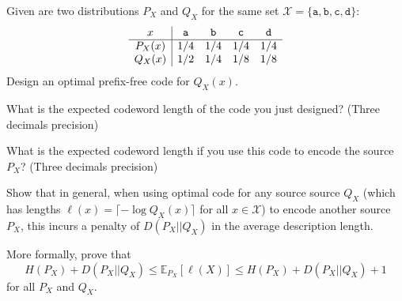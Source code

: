 \documentclass[a4paper,10pt,landscape,twocolumn]{scrartcl}
\begin{document}
\begin{exercise}
\begin{subex}[(2pt)]
Given are two distributions $P_X$ and $Q_X$ for the same set $\mathcal{X} = \{\mathtt{a,b,c,d}\}$:
\[
\begin{array}{c | c c c c}
x & \mathtt{a}&\mathtt{b}&\mathtt{c}&\mathtt{d}\\\hline
P_X(x) & 1/4&1/4&1/4&1/4\\
Q_X(x) & 1/2&1/4&1/8&1/8\\
\end{array}
\]
Design an optimal prefix-free code for $Q_X(x)$.
\end{subex}
\begin{subex}[(4pt)]
What is the expected codeword length of the code you just designed? (Three decimals precision)
\end{subex}
\begin{subex}[(4pt)]
What is the expected codeword length if you use this code to encode the source $P_X$? (Three decimals precision)
\end{subex}
\begin{subex}[(4pt)]
Show that in general, when using optimal code for any source source $Q_X$ (which has lengths $\ell(x) = \lceil -\log Q_X(x) \rceil$ for all $x \in \mathcal{X}$) to encode another source $P_X$, this incurs a penalty of $D(P_X||Q_X)$ in the average description length.

More formally, prove that
\[
H(P_X) + D(P_X||Q_X) \leq \mathbb{E}_{P_X}[\ell(X)] \leq H(P_X) + D(P_X||Q_X) + 1
\]
for all $P_X$ and $Q_X$.
\end{subex}
\end{exercise}
\end{document}
